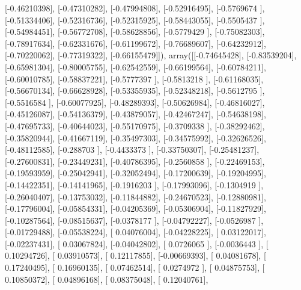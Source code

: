 \documentclass{article}
\begin{document}
       [-0.46210398],
       [-0.47310282],
       [-0.47994808],
       [-0.52916495],
       [-0.5769674 ],
       [-0.51334406],
       [-0.52316736],
       [-0.52315925],
       [-0.58443055],
       [-0.5505437 ],
       [-0.54984451],
       [-0.56772708],
       [-0.58628856],
       [-0.5779429 ],
       [-0.75082303],
       [-0.78917634],
       [-0.62331676],
       [-0.61199672],
       [-0.76689607],
       [-0.64232912],
       [-0.70220062],
       [-0.77319322],
       [-0.66155479]]), array([[-0.74645428],
       [-0.83539204],
       [-0.65981304],
       [-0.80005755],
       [-0.62542559],
       [-0.66199564],
       [-0.60784211],
       [-0.60010785],
       [-0.58837221],
       [-0.5777397 ],
       [-0.5813218 ],
       [-0.61168035],
       [-0.56670134],
       [-0.66628928],
       [-0.53355935],
       [-0.52348218],
       [-0.5612795 ],
       [-0.5516584 ],
       [-0.60077925],
       [-0.48289393],
       [-0.50626984],
       [-0.46816027],
       [-0.45126087],
       [-0.54136379],
       [-0.43879057],
       [-0.42467247],
       [-0.54638198],
       [-0.47695733],
       [-0.40644023],
       [-0.55170975],
       [-0.3709338 ],
       [-0.38292462],
       [-0.35820944],
       [-0.41667119],
       [-0.35497303],
       [-0.34575992],
       [-0.32626526],
       [-0.48112585],
       [-0.288703  ],
       [-0.4433373 ],
       [-0.33750307],
       [-0.25481237],
       [-0.27600831],
       [-0.23449231],
       [-0.40786395],
       [-0.2560858 ],
       [-0.22469153],
       [-0.19593959],
       [-0.25042941],
       [-0.32052494],
       [-0.17200639],
       [-0.19204995],
       [-0.14422351],
       [-0.14141965],
       [-0.1916203 ],
       [-0.17993096],
       [-0.1304919 ],
       [-0.26040407],
       [-0.13753032],
       [-0.11844882],
       [-0.24670523],
       [-0.12880981],
       [-0.17796004],
       [-0.05854331],
       [-0.04205369],
       [-0.05306904],
       [-0.11827929],
       [-0.10287564],
       [-0.08515637],
       [-0.0378177 ],
       [-0.04792227],
       [-0.0526987 ],
       [-0.01729488],
       [-0.05538224],
       [ 0.04076004],
       [-0.04228225],
       [ 0.03122017],
       [-0.02237431],
       [ 0.03067824],
       [-0.04042802],
       [ 0.0726065 ],
       [-0.0036443 ],
       [ 0.10294726],
       [ 0.03910573],
       [ 0.12117855],
       [-0.00669393],
       [ 0.04081678],
       [ 0.17240495],
       [ 0.16960135],
       [ 0.07462514],
       [ 0.0274972 ],
       [ 0.04875753],
       [ 0.10850372],
       [ 0.04896168],
       [ 0.08375048],
       [ 0.12040761],
\end{document}
